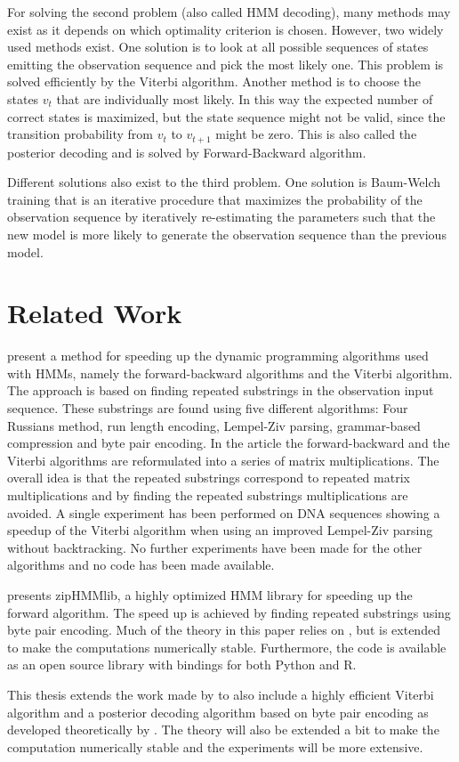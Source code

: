 For solving the second problem (also called HMM decoding), many
methods may exist as it depends on which optimality criterion is chosen.
However, two widely used methods exist. One solution is to look at all possible
sequences of states emitting the observation sequence and pick the most likely
one. This problem is solved efficiently by the Viterbi algorithm. Another
method is to choose the states $v_t$ that are individually most likely. In this
way the expected number of correct states is maximized, but the state sequence
might not be valid, since the transition probability from $v_t$ to $v_{t + 1}$
might be zero. This is also called the posterior decoding and is solved by
Forward-Backward algorithm.

Different solutions also exist to the third problem. One solution is Baum-Welch
training that is an iterative procedure that maximizes the probability of the
observation sequence by iteratively re-estimating the parameters such that the
new model is more likely to generate the observation sequence than the previous
model.

\section{Related Work}

\citet{lifshits2009speeding} present a method for speeding up the dynamic
programming algorithms used with HMMs, namely the forward-backward algorithms
and the Viterbi algorithm. The approach is based on finding repeated substrings
in the observation input sequence. These substrings are found using five
different algorithms: Four Russians method, run length encoding, Lempel-Ziv
parsing, grammar-based compression and byte pair encoding. In the article the
forward-backward and the Viterbi algorithms are reformulated into a series of
matrix multiplications. The overall idea is that the repeated substrings
correspond to repeated matrix multiplications and by finding the repeated
substrings multiplications are avoided. A single experiment has been
performed on DNA sequences showing a speedup of the Viterbi algorithm when
using an improved Lempel-Ziv parsing without backtracking. No further
experiments have been made for the other algorithms and no code has been made
available.

\citet{sand2013ziphmmlib} presents zipHMMlib, a highly optimized HMM library for
speeding up the forward algorithm. The speed up is achieved by finding repeated
substrings using byte pair encoding. Much of the theory in this paper relies on
\cite{lifshits2009speeding}, but is extended to make the computations
numerically stable. Furthermore, the code is available as an open source
library with bindings for both Python and R.

This thesis extends the work made by \citet{sand2013ziphmmlib} to also include
a highly efficient Viterbi algorithm and a posterior decoding algorithm based
on byte pair encoding as developed theoretically by
\citet{lifshits2009speeding}. The theory will also be extended a bit to make
the computation numerically stable and the experiments will be more extensive.

